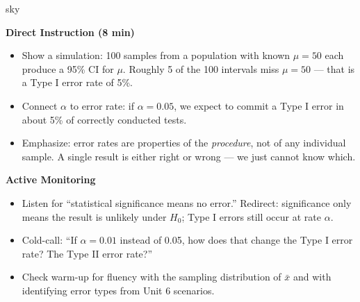 \documentclass[10pt]{article}
\begin{document}
\begin{skillbox}{sky}
\begin{minipage}[t]{0.48\linewidth}
    \textbf{Direct Instruction (8 min)}
    \begin{itemize}
        \item Show a simulation: 100 samples from a population with known $\mu = 50$
              each produce a 95\% CI for $\mu$. Roughly 5 of the 100 intervals miss
              $\mu = 50$ --- that is a Type I error rate of 5\%.
        \item Connect $\alpha$ to error rate: if $\alpha = 0.05$, we expect to commit
              a Type I error in about 5\% of correctly conducted tests.
        \item Emphasize: error rates are properties of the \emph{procedure}, not of
              any individual sample. A single result is either right or wrong --- we
              just cannot know which.
    \end{itemize}
\end{minipage}
\hfill
\begin{minipage}[t]{0.48\linewidth}
    \textbf{Active Monitoring}
    \begin{itemize}
        \item Listen for ``statistical significance means no error.'' Redirect:
              significance only means the result is unlikely under $H_0$; Type I
              errors still occur at rate $\alpha$.
        \item Cold-call: ``If $\alpha = 0.01$ instead of 0.05, how does that change
              the Type I error rate? The Type II error rate?''
        \item Check warm-up for fluency with the sampling distribution of $\bar x$
              and with identifying error types from Unit 6 scenarios.
    \end{itemize}
\end{minipage}
\end{skillbox}
\end{document}
